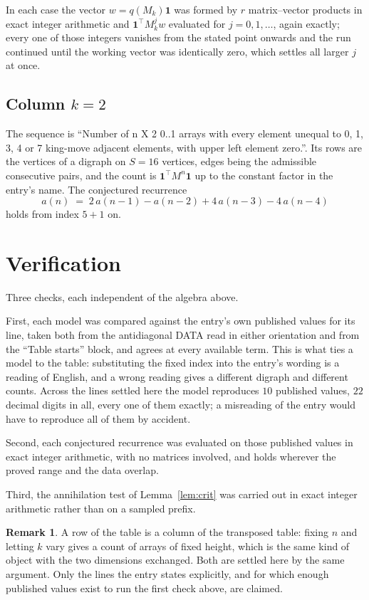\documentclass[11pt,a4paper]{article}
\theoremstyle{plain}
\theoremstyle{definition}
\newtheorem{remark}[theorem]{Remark}
\begin{document}
In each case the vector $w=q(M_k)\mathbf{1}$ was formed by $r$ matrix--vector products in
exact integer arithmetic and $\mathbf{1}^{\!\top}M_k^{j}w$ evaluated for $j=0,1,\dots$,
again exactly; every one of those integers vanishes from the stated point onwards and the run
continued until the working vector was identically zero, which settles all larger $j$ at once.

\subsection*{Column $k$$=2$}
The sequence is ``Number of n X 2 0..1 arrays with every element unequal to 0, 1, 3, 4 or 7 king-move adjacent elements, with upper left element zero.''. Its rows are the vertices of a digraph on
$S=16$ vertices, edges being the admissible consecutive pairs, and the count is
$\mathbf{1}^{\!\top}M^{n}\mathbf{1}$ up to the constant factor in the entry's name.
The conjectured recurrence
\[
a(n)\;=\;2\,a(n-1) - a(n-2) + 4\,a(n-3) - 4\,a(n-4)
\]
holds from index $5+1$ on.

\section{Verification}

Three checks, each independent of the algebra above.

First, each model was compared against the entry's own published values for its line, taken
both from the antidiagonal DATA read in either orientation and from the ``Table starts''
block, and agrees at every available term. This is what ties a model to the table:
substituting the fixed index into the entry's wording is a reading of English, and a wrong
reading gives a different digraph and different counts. Across the lines settled here the
model reproduces $10$ published values, $22$ decimal digits in all, every one of
them exactly; a misreading of the entry would have to reproduce all of them by accident.

Second, each conjectured recurrence was evaluated on those published values in exact
integer arithmetic, with no matrices involved, and holds wherever the proved range and the
data overlap.

Third, the annihilation test of Lemma~\ref{lem:crit} was carried out in exact integer
arithmetic rather than on a sampled prefix.

\begin{remark}
A row of the table is a column of the transposed table: fixing $n$ and letting $k$ vary gives a
count of arrays of fixed height, which is the same kind of object with the two dimensions
exchanged. Both are settled here by the same argument. Only the lines the entry states
explicitly, and for which enough published values exist to run the first check above, are
claimed.
\end{remark}
\end{document}
